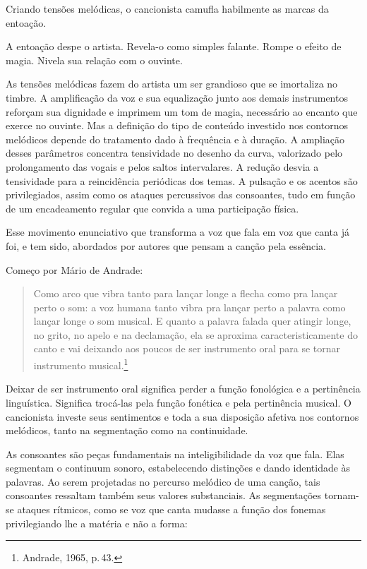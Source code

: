 Criando tensões melódicas, o cancionista camufla habilmente as marcas da
entoação.

A entoação despe o artista. Revela-o como simples falante. Rompe o
efeito de magia. Nivela sua relação com o ouvinte.

As tensões melódicas fazem do artista um ser grandioso que se imortaliza
no timbre. A amplificação da voz e sua equalização junto aos demais
instrumentos reforçam sua dignidade e imprimem um tom de magia,
necessário ao encanto que exerce no ouvinte. Mas a definição do tipo de
conteúdo investido nos contornos melódicos depende do tratamento dado à
frequência e à duração. A ampliação desses parâmetros concentra
tensividade no desenho da curva, valorizado pelo prolongamento das
vogais e pelos saltos intervalares. A redução desvia a tensividade para
a reincidência periódicas dos temas. A pulsação e os acentos são
privilegiados, assim como os ataques percussivos das consoantes, tudo em
função de um encadeamento regular que convida a uma participação física.

Esse movimento enunciativo que transforma a voz que fala em voz que
canta já foi, e tem sido, abordados por autores que pensam a canção pela
essência.

Começo por Mário de Andrade:

\begin{quote}
Como arco que vibra tanto para lançar longe a flecha como pra lançar
perto o som: a voz humana tanto vibra pra lançar perto a palavra como
lançar longe o som musical. E quanto a palavra falada quer atingir
longe, no grito, no apelo e na declamação, ela se aproxima
caracteristicamente do canto e vai deixando aos poucos de ser
instrumento oral para se tornar instrumento musical.\footnote{Andrade, 1965,
p.\,43.}
\end{quote}

Deixar de ser instrumento oral significa perder a função fonológica e a
pertinência linguística. Significa trocá-las pela função fonética e pela
pertinência musical. O cancionista investe seus sentimentos e toda a sua
disposição afetiva nos contornos melódicos, tanto na segmentação como na
continuidade.

As consoantes são peças fundamentais na inteligibilidade da voz que
fala. Elas segmentam o continuum sonoro, estabelecendo distinções e
dando identidade às palavras. Ao serem projetadas no percurso melódico
de uma canção, tais consoantes ressaltam também seus valores
substanciais. As segmentações tornam-se ataques rítmicos, como se voz
que canta mudasse a função dos fonemas privilegiando lhe a matéria e não
a forma:

